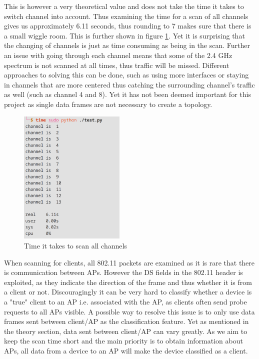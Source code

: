 This is however a very theoretical value and does not take the time it takes to switch channel into account. Thus examining the time for a scan of all channels gives us approximately 6.11 seconds, thus rounding to 7 makes sure that there is a small wiggle room. This is further shown in figure \ref{timne_to_scan}. Yet it is surprising that the changing of channels is just as time consuming as being in the scan. Further an issue with going through each channel means that some of the 2.4 GHz spectrum is not scanned at all times, thus traffic will be missed. Different approaches to solving this can be done, such as using more interfaces or staying in channels that are more centered thus catching the surrounding channel's traffic as well (such as channel 4 and 8). Yet it has not been deemed important for this project as single data frames are not necessary to create a topology. 

\begin{figure}[!htbp]
    \centering
    \includegraphics[width=0.45\textwidth]{Latex-Files/Billeder/Implementation/time_to_scan.png}
    \caption{Time it takes to scan all channels}
    \label{timne_to_scan}
\end{figure}
 
When scanning for clients, all 802.11 packets are examined as it is rare that there is communication between APs. However the DS fields in the 802.11 header is exploited, as they indicate the direction of the frame and thus whether it is from a client or not. Discouragingly it can be very hard to classify whether a device is a "true" client to an AP i.e. associated with the AP, as clients often send probe requests to all APs visible. A possible way to resolve this issue is to only use data frames sent between client/AP as the classification feature. Yet as mentioned in the theory section, data sent between client/AP can vary greatly. As we aim to keep the scan time short and the main priority is to obtain information about APs, all data from a device to an AP will make the device classified as a client.  

